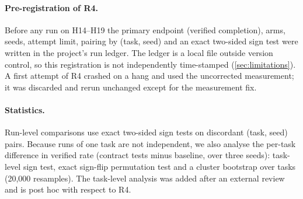 \documentclass[11pt]{article}
\begin{document}
\paragraph{Pre-registration of R4.} Before any run on H14--H19 the primary endpoint (verified completion), arms, seeds, attempt limit, pairing by (task, seed) and an exact two-sided sign test were written in the project's run ledger. The ledger is a local file outside version control, so this registration is not independently time-stamped (\cref{sec:limitations}). A first attempt of R4 crashed on a hang and used the uncorrected measurement; it was discarded and rerun unchanged except for the measurement fix.

\paragraph{Statistics.} Run-level comparisons use exact two-sided sign tests on discordant (task, seed) pairs. Because runs of one task are not independent, we also analyse the per-task difference in verified rate (contract tests minus baseline, over three seeds): task-level sign test, exact sign-flip permutation test and a cluster bootstrap over tasks (20{,}000 resamples). The task-level analysis was added after an external review and is post hoc with respect to R4.
\end{document}
